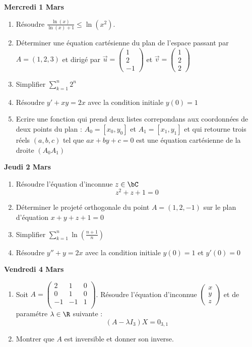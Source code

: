 \documentclass[a4paper, 11pt,reqno]{article}
\renewcommand{\ddp}{\displaystyle}
\newcommand\vv[1]{\overrightarrow{#1}}
\begin{document}
\begin{center}
\textbf{Mercredi 1  Mars}
\end{center}
\begin{enumerate}
\item Résoudre $\frac{\ln(x)}{\ln(x)+1}\leq \ln{(x^2)}$.
\item Déterminer  une équation cartésienne du plan de l'espace passant par $A=(1,2,3)$ et dirigé par $\vv{u} =\begin{pmatrix}
1\\2\\-1
\end{pmatrix}$ et $\vv{v} =\begin{pmatrix}
1\\2\\2
\end{pmatrix}$ 
\item Simplifier $\ddp \sum_{k=1}^n 2^n$
\item Résoudre $y'+xy=2x$ avec la condition initiale $y(0)=1$
\item Ecrire une fonction qui prend deux listes correpondans aux  coordonnées de deux points du plan : $A_0=[x_0, y_0]$ et $A_1=[x_1, y_1]$ et qui retourne trois réels $(a,b,c)$ tel que $ax+by+c=0$ est une équation cartésienne de la droite $(A_0A_1)$
\end{enumerate}




\begin{center}
\textbf{Jeudi 2  Mars}
\end{center}
\begin{enumerate}
\item Résoudre l'équation d'inconnue $z\in \bC$ 
$$z^2+z+1=0$$
\item Déterminer le projeté orthogonale du point $A=(1,2,-1)$ sur le plan d'équation $x+y+z+1=0$
\item Simplifier $\ddp \sum_{k=1}^n \ln\left( \frac{n+1}{n}\right)$
\item Résoudre $y''+y=2x$ avec la condition initiale $y(0)=1$ et $y'(0)=0$
\end{enumerate}





\begin{center}
\textbf{Vendredi 4  Mars}
\end{center}

\begin{enumerate}
\item Soit $A=\begin{pmatrix}
2 &1& 0\\
 0&1 &0  \\
 -1&-1&1\\
\end{pmatrix}$. Résoudre l'équation d'inconnue $\begin{pmatrix}
x\\y\\z
\end{pmatrix}$ et de paramétre $\lambda \in \R$ suivante : 
$$(A -\lambda I_3) X = 0_{3,1}$$
\item Montrer que $A$ est inversible et donner son inverse.
\end{enumerate}
\end{document}
